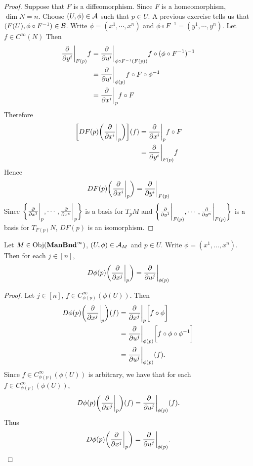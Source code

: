 \documentclass{book}
\begin{document}
	\begin{proof}
		Suppose that $F$ is a diffeomorphism. Since $F$ is a homeomorphism, $\dim N = n$. Choose $(U, \phi) \in \mathcal{A}$ such that $p \in U$. A previous exercise tells us that $(F(U), \phi \circ F^{-1}) \in \mathcal{B}$. Write $\phi = (x^1, \cdots, x^n)$ and $\phi \circ F^{-1} = (y^1, \cdots, y^n)$. Let $f \in C^{\infty}(N)$ Then 
		\begin{align*}
			\frac{\partial}{\partial y^i} \bigg|_{F(p)} f
			&= 	\frac{\partial}{\partial u^i} \bigg|_{\phi \circ F^{-1} (F(p))} f \circ (\phi \circ F^{-1})^{-1} \\
			&= 	\frac{\partial}{\partial u^i} \bigg|_{\phi(p)} f \circ F \circ \phi^{-1} \\
			&= 	\frac{\partial}{\partial x^i} \bigg|_p f \circ F \\
		\end{align*}
		Therefore 
		\begin{align*}
			\bigg[ DF(p) \bigg( \frac{\partial}{\partial x^i} \bigg|_p \bigg) \bigg] (f)
			&= \frac{\partial}{\partial x^i} \bigg|_p f \circ F \\
			&= \frac{\partial}{\partial y^i} \bigg|_{F(p)} f 
		\end{align*}
	Hence $$DF(p) \bigg( \frac{\partial}{\partial x^i} \bigg|_p \bigg) = \frac{\partial}{\partial y^i} \bigg|_{F(p)}$$ 
	Since $\bigg \{\frac{\partial}{\partial x^1} \bigg|_p, \cdots, \frac{\partial}{\partial x^n} \bigg|_p \bigg \}$ is a basis for $T_pM$ and $\bigg \{\frac{\partial}{\partial y^1} \bigg|_{F(p)}, \cdots, \frac{\partial}{\partial y^n} \bigg|_{F(p)} \bigg \}$ is a basis for $T_{F(p)}N$, $DF(p)$ is an isomorphism.
	\end{proof}

	\begin{ex}
		Let $M \in \operatorname{Obj}(\operatorname*{\text{\textbf{ManBnd}}^{\infty}})$, $(U, \phi) \in \mathcal{A}_M$ and $p \in U$. Write $\phi = (x^1, \ldots, x^n)$. Then for each $j \in [n]$, 
		$$D\phi(p) \bigg( \frac{\partial}{\partial x^j} \bigg|_p \bigg) = \frac{\partial}{\partial u^j} \bigg|_{\phi(p)}$$
	\end{ex}
	
	\begin{proof}
		Let $j \in [n]$, $f \in C^{\infty}_{\phi(p)}(\phi(U))$. Then 
		\begin{align*}
			D\phi(p) \bigg( \frac{\partial}{\partial x^j} \bigg|_p \bigg)(f) 
			& = \frac{\partial}{\partial x^j} \bigg|_p \bigg[ f \circ \phi \bigg] \\
			& = \frac{\partial}{\partial u^j} \bigg|_{\phi(p)} \bigg[ f \circ \phi \circ \phi^{-1} \bigg] \\
			& =  \frac{\partial}{\partial u^j} \bigg|_{\phi(p)} (f).
		\end{align*} 
		Since $f \in C^{\infty}_{\phi(p)}(\phi(U))$ is arbitrary, we have that for each $f \in C^{\infty}_{\phi(p)}(\phi(U))$, 
		$$D\phi(p) \bigg( \frac{\partial}{\partial x^j} \bigg|_p \bigg)(f)  = \frac{\partial}{\partial u^j} \bigg|_{\phi(p)} (f).$$ 
		Thus 
		$$D\phi(p) \bigg( \frac{\partial}{\partial x^j} \bigg|_p \bigg) = \frac{\partial}{\partial u^j} \bigg|_{\phi(p)}. $$
	\end{proof}
\end{document}
